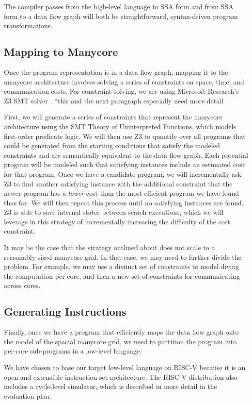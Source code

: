 \documentclass{sig-alternate-05-2015}
\newcommand{\note}{\color{red}$*$}
\begin{document}
The compiler passes from the high-level language to SSA form and from SSA form to a data flow graph will both be straightforward, syntax-driven program transformations. 

\subsection{Mapping to Manycore}
Once the program representation is in a data flow graph, mapping it to the manycore architecture involves solving a series of constraints on space, time, and communication costs. For constraint solving, we are using Microsoft Research's Z3 SMT solver \cite{z3}. {\note this and the next paragraph especially need more detail}

First, we will generate a series of constraints that represent the manycore architecture using the SMT Theory of Uninterpreted Functions, which models first-order predicate logic. We will then use Z3 to quantify over all programs that could be generated from the starting conditions that satisfy the modeled constraints and are semantically equivalent to the data flow graph. Each potential program will be modeled such that satisfying instances include an estimated cost for that program. Once we have a candidate program, we will incrementally ask Z3 to find another satisfying instance with the additional constraint that the newer program has a \emph{lower} cost than the most efficient program we have found thus far. We will then repeat this process until no satisfying instances are found. Z3 is able to save internal states between search executions, which we will leverage in this strategy of incrementally increasing the difficulty of the cost constraint.

It may be the case that the strategy outlined about does not scale to a reasonably sized manycore grid. In that case, we may need to further divide the problem. For example, we may use a distinct set of constraints to model diving the computation per-core, and then a new set of constraints for communicating across cores. 

\subsection{Generating Instructions}
Finally, once we have a program that efficiently maps the data flow graph onto the model of the spacial manycore grid, we need to partition the program into per-core sub-programs in a low-level language. 

We have chosen to base our target low-level language on RISC-V because it is an open and extensible instruction set architecture. The RISC-V distribution also includes a cycle-level simulator, which is described in more detail in the evaluation plan. 
\end{document}
